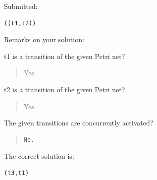 Submitted:


\begin{verbatim}
((t1,t2))
\end{verbatim}


Remarks on your solution:

t1 is a transition of the given Petri net?\begin{quote}Yes.\end{quote}t2 is a transition of the given Petri net?\begin{quote}Yes.\end{quote}The given transitions are concurrently activated?

\begin{quote}
\begin{verbatim}
No.
\end{verbatim}
\end{quote}

The correct solution is:
\begin{verbatim}
(t3,t1)
\end{verbatim}


